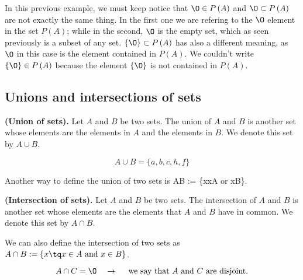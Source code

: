 In this previous example, we must keep notice that $\O\in P\left( A \right)$ and $\O\subset P\left( A \right)$ are not exactly the same thing. In the first one we are refering to the $\O$ element in the set $P\left( A \right)$; while in the second, $\O$ is the empty set, which as seen previously is a subset of any set. $\{\O\}\subset P\left( A \right)$ has also a different meaning, as $\O$ in this case is the element contained in $P\left( A \right)$. We couldn't write $\{\O\}\in P\left( A \right)$ because the element $\{\O\}$ is not contained in $P\left( A \right) $.

\subsection{Unions and intersections of sets}
\begin{definition}
    \textbf{(Union of sets).} Let $A$ and $B$ be two sets. The union of $A$ and $B$ is another set whose elements are the elements in $A$ and the elements in $B$. We denote this set by $A\cup B$.
\end{definition}
\begin{example}[Let $A = \{a, b, c\} $ and $B = \{b, h, f\} $]
    \begin{equation}
        A\cup B = \{a, b, c, h, f\} 
    \end{equation}
\end{example}

Another way to define the union of two sets is A\cup B := \{x\tq x\in A\textrm{ or } x\in B\}.

\begin{definition}
    \textbf{(Intersection of sets).} Let $A$ and $B$ be two sets. The intersection of $A$ and $B$ is another set whose elements are the elements that $A$ and $B$ have in common. We denote this set by $A\cap B$. 
\end{definition}

We can also define the intersection of two sets as $A\cap B := \{x\tq x\in A\textrm{ and } x\in B\} $.

\begin{example}[Let $A\cap B = \{b\} $ and $C = \{x, y, z\} $.]
    \begin{equation}
        A\cap C = \O \quad\rightarrow\quad\textrm{ we say that $A$ and $C$ are disjoint.}
    \end{equation}
\end{example}

